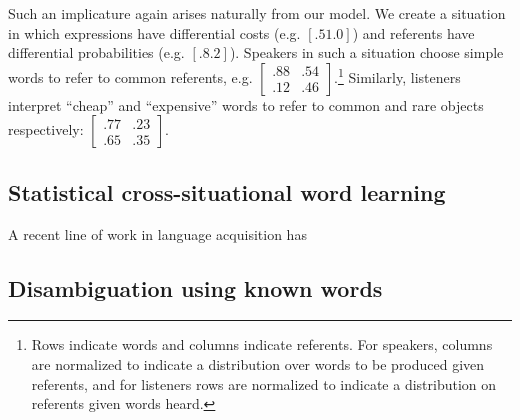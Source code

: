 \documentclass{article} %
\begin{document}
Such an implicature again arises naturally from our model. We create a situation in which expressions have differential costs (e.g. $[.5 1.0]$) and referents have differential probabilities (e.g. $[.8 .2]$). Speakers in such a situation choose simple words to refer to common referents, e.g. 
$\left[
    \begin{array}{cc}
      .88 & .54 \\
      .12 & .46
    \end{array} 
  \right]$.\footnote{Rows indicate words and columns indicate referents. For speakers, columns are normalized to indicate a distribution over words to be produced given referents, and for listeners rows are normalized to indicate a distribution on referents given words heard.} Similarly, listeners interpret ``cheap'' and ``expensive'' words to refer to common and rare objects respectively:
$\left[
    \begin{array}{cc}
      .77 & .23 \\
      .65 & .35
    \end{array} 
  \right]$.


%
%

\subsection{Statistical cross-situational word learning}

A recent line of work in language acquisition has 

\subsection{Disambiguation using known words}

\end{document}
